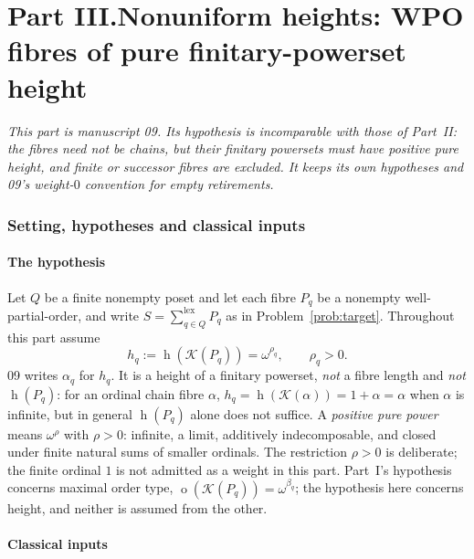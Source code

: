 \documentclass[11pt,a4paper]{article}
\theoremstyle{definition}
\theoremstyle{remark}
\newcommand{\K}{\mathcal K}
\newcommand{\ot}{\operatorname{o}}
\newcommand{\hgt}{\operatorname{h}}
\newcommand{\lxsi}{\mathop{\textstyle\sum}\nolimits^{\mathrm{lex}}}
\begin{document}
\clearpage
{}\part*{Part III.\quad Nonuniform heights: WPO fibres of pure finitary-powerset height}

\noindent\emph{This part is manuscript 09. Its hypothesis is incomparable with
those of Part~II: the fibres need not be chains, but their finitary powersets
must have positive pure height, and finite or successor fibres are excluded.
It keeps its own hypotheses and 09's weight-$0$ convention for empty
retirements.}

\section{Setting, hypotheses and classical inputs}\label{nh:wpo:sec:setting}

\subsection{The hypothesis}

Let $Q$ be a finite nonempty poset and let each fibre $P_q$ be a nonempty
well-partial-order, and write $S=\lxsi_{q\in Q}P_q$ as in
Problem~\ref{prob:target}. Throughout this part assume
\begin{equation}\label{nh:wpo:eq:hyp}
 h_q:=\hgt(\K(P_q))=\omega^{\rho_q},\qquad\rho_q>0 .
\end{equation}
09 writes $\alpha_q$ for $h_q$. It is a height of a finitary powerset,
\emph{not} a fibre length and \emph{not} $\hgt(P_q)$: for an ordinal chain
fibre $\alpha$, $h_q=\hgt(\K(\alpha))=1+\alpha=\alpha$ when $\alpha$ is
infinite, but in general $\hgt(P_q)$ alone does not suffice. A \emph{positive
pure power} means $\omega^\rho$ with $\rho>0$: infinite, a limit, additively
indecomposable, and closed under finite natural sums of smaller ordinals. The
restriction $\rho>0$ is deliberate; the finite ordinal $1$ is not admitted as a
weight in this part. Part~I's hypothesis concerns maximal order type,
$\ot(\K(P_q))=\omega^{\beta_q}$; the hypothesis here concerns height, and
neither is assumed from the other.

\subsection{Classical inputs}
\end{document}
